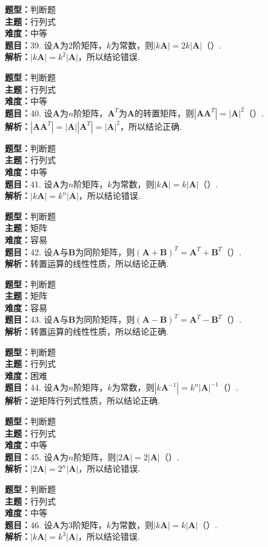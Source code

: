 \documentclass{ctexart}
\newenvironment{question}[5]{%
	\noindent\textbf{题型：}#1\\
	\textbf{主题：}#2\\
	\textbf{难度：}#3\\
	\textbf{题目：}#4\\
	\textbf{解析：}#5\\
	\vspace{1em}
}{}
\begin{document}
	\begin{question}
		{判断题}
		{行列式}
		{中等}
		{39. 设\(\mathbf{A}\)为2阶矩阵，\(k\)为常数，则\(|k\mathbf{A}|=2k|\mathbf{A}|\)（）.}
		{\(|k\mathbf{A}|=k^2|\mathbf{A}|\)，所以结论错误.}
	\end{question}
	
	\begin{question}
		{判断题}
		{行列式}
		{中等}
		{40. 设\(\mathbf{A}\)为\(n\)阶矩阵，\(\mathbf{A}^T\)为\(\mathbf{A}\)的转置矩阵，则\(|\mathbf{AA}^T|=|\mathbf{A}|^2\)（）.}
		{\(|\mathbf{AA}^T|=|\mathbf{A}||\mathbf{A}^T|=|\mathbf{A}|^2\)，所以结论正确.}
	\end{question}
	
	\begin{question}
		{判断题}
		{行列式}
		{中等}
		{41. 设\(\mathbf{A}\)为\(n\)阶矩阵，\(k\)为常数，则\(|k\mathbf{A}|=k|\mathbf{A}|\)（）.}
		{\(|k\mathbf{A}|=k^n|\mathbf{A}|\)，所以结论错误.}
	\end{question}
	
	\begin{question}
		{判断题}
		{矩阵}
		{容易}
		{42. 设\(\mathbf{A}\)与\(\mathbf{B}\)为同阶矩阵，则\((\mathbf{A}+\mathbf{B})^T=\mathbf{A}^T+\mathbf{B}^T\)（）.}
		{转置运算的线性性质，所以结论正确.}
	\end{question}
	
	\begin{question}
		{判断题}
		{矩阵}
		{容易}
		{43. 设\(\mathbf{A}\)与\(\mathbf{B}\)为同阶矩阵，则\((\mathbf{A}-\mathbf{B})^T=\mathbf{A}^T-\mathbf{B}^T\)（）.}
		{转置运算的线性性质，所以结论正确.}
	\end{question}
	
	\begin{question}
		{判断题}
		{行列式}
		{困难}
		{44. 设\(\mathbf{A}\)为\(n\)阶矩阵，\(k\)为常数，则\(|k\mathbf{A}^{-1}|=k^n|\mathbf{A}|^{-1}\)（）.}
		{逆矩阵行列式性质，所以结论正确.}
	\end{question}
	
	\begin{question}
		{判断题}
		{行列式}
		{中等}
		{45. 设\(\mathbf{A}\)为\(n\)阶矩阵，则\(|2\mathbf{A}|=2|\mathbf{A}|\)（）.}
		{\(|2\mathbf{A}|=2^n|\mathbf{A}|\)，所以结论错误.}
	\end{question}
	
	\begin{question}
		{判断题}
		{行列式}
		{中等}
		{46. 设\(\mathbf{A}\)为3阶矩阵，\(k\)为常数，则\(|k\mathbf{A}|=k|\mathbf{A}|\)（）.}
		{\(|k\mathbf{A}|=k^3|\mathbf{A}|\)，所以结论错误.}
	\end{question}
	
\end{document}
